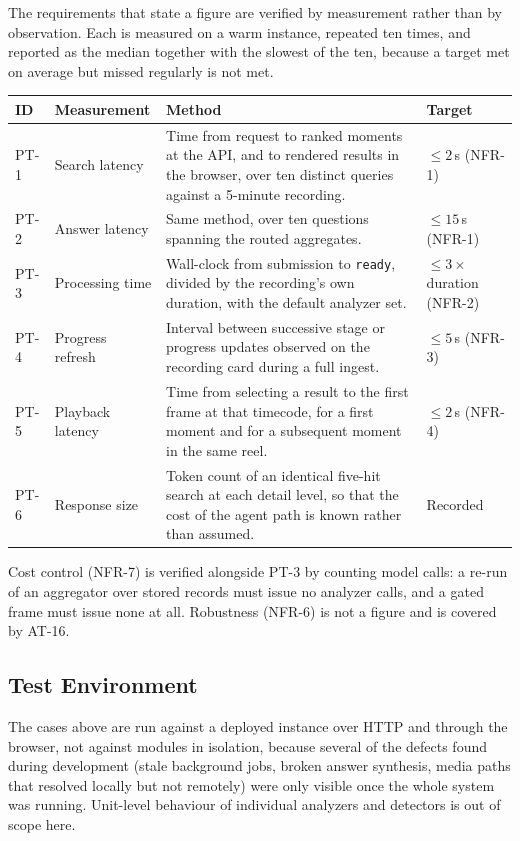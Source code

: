 The requirements that state a figure are verified by measurement rather than by
observation. Each is measured on a warm instance, repeated ten times, and reported as
the median together with the slowest of the ten, because a target met on average but
missed regularly is not met.

\begin{table}[htbp]
\centering
\small
\begin{tabularx}{\textwidth}{@{}L{1.1cm}L{3.0cm}XL{1.6cm}@{}}
\toprule
\textbf{ID} & \textbf{Measurement} & \textbf{Method} & \textbf{Target} \\
\midrule
PT-1 & Search latency &
Time from request to ranked moments at the API, and to rendered results in the browser,
over ten distinct queries against a 5-minute recording. & $\leq 2$\,s (NFR-1) \\
PT-2 & Answer latency &
Same method, over ten questions spanning the routed aggregates. & $\leq 15$\,s (NFR-1) \\
PT-3 & Processing time &
Wall-clock from submission to \texttt{ready}, divided by the recording's own duration,
with the default analyzer set. & $\leq 3\times$ duration (NFR-2) \\
PT-4 & Progress refresh &
Interval between successive stage or progress updates observed on the recording card
during a full ingest. & $\leq 5$\,s (NFR-3) \\
PT-5 & Playback latency &
Time from selecting a result to the first frame at that timecode, for a first moment and
for a subsequent moment in the same reel. & $\leq 2$\,s (NFR-4) \\
PT-6 & Response size &
Token count of an identical five-hit search at each detail level, so that the cost of the
agent path is known rather than assumed. & Recorded \\
\bottomrule
\end{tabularx}
\end{table}

Cost control (NFR-7) is verified alongside PT-3 by counting model calls: a re-run of an
aggregator over stored records must issue no analyzer calls, and a gated frame must issue
none at all. Robustness (NFR-6) is not a figure and is covered by AT-16.

\subsection{Test Environment}

The cases above are run against a deployed instance over HTTP and through the browser,
not against modules in isolation, because several of the defects found during
development (stale background jobs, broken answer synthesis, media paths that resolved
locally but not remotely) were only visible once the whole system was running.
Unit-level behaviour of individual analyzers and detectors is out of scope here.

